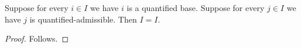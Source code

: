 

\begin{theorem}\label{quantified_headers}
    Suppose for every $i\in I$ we have $i$ is a quantified base.
    Suppose for every $j\in I$ we have $j$ is quantified-admissible.
    Then $I=I$.
\end{theorem}
\begin{proof}
    Follows.
\end{proof}
